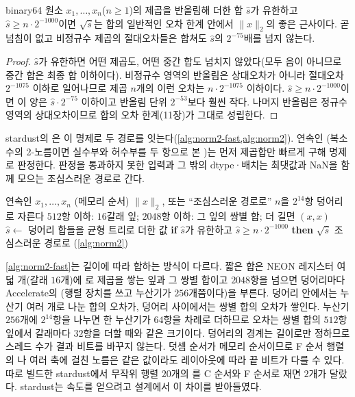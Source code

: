\begin{proposition}
\label{prop:norm-trust}
binary64 원소 $x_1,\dots,x_n$($n\ge1$)의 제곱을 반올림해 더한 합 $\hat s$가 유한하고 $\hat s\ge n\cdot2^{-1000}$이면 $\sqrt{\hat s}$는 합의 일반적인 오차 한계 안에서 $\|x\|_2$의 좋은 근사이다. 곧 넘침이 없고 비정규수 제곱의 절대오차들은 합쳐도 $\hat s$의 $2^{-75}$배를 넘지 않는다.
\end{proposition}

\begin{proof}
$\hat s$가 유한하면 어떤 제곱도, 어떤 중간 합도 넘치지 않았다(모두 음이 아니므로 중간 합은 최종 합 이하이다). 비정규수 영역의 반올림은 상대오차가 아니라 절대오차 $2^{-1075}$ 이하로 일어나므로 제곱 $n$개의 이런 오차는 $n\cdot2^{-1075}$ 이하이다. $\hat s\ge n\cdot2^{-1000}$이면 이 양은 $\hat s\cdot2^{-75}$ 이하이고 반올림 단위 $2^{-53}$보다 훨씬 작다. 나머지 반올림은 정규수 영역의 상대오차이므로 합의 오차 한계(11장)가 그대로 성립한다.
\end{proof}

stardust의 은 이 명제로 두 경로를 잇는다(\cref{alg:norm2-fast,alg:norm2}). 연속인 (복소수의 2-노름이면 실수부와 허수부를 두 항으로 본 )는 먼저 제곱합만 빠르게 구해 명제로 판정한다. 판정을 통과하지 못한 입력과 그 밖의 dtype·배치는 최댓값과 NaN을 함께 모으는 조심스러운 경로로 간다.

\begin{algorithm}[htbp]
\begin{algorithmic}[1]
\Require 연속인  $x_1,\dots,x_n$ (메모리 순서)
\Ensure $\|x\|_2$, 또는 ``조심스러운 경로로''
\State $n$을 $2^{14}$항 덩어리로 자른다 
  \State $512$항 이하: $16$갈래  잎; $2048$항 이하: 그 잎의 쌍별 합; 더 길면 $(x,x)$
\EndFor
\State $\hat s\gets$ 덩어리 합들을 균형 트리로 더한 값
\State \textbf{if} $\hat s$가 유한하고 $\hat s\ge n\cdot2^{-1000}$ \textbf{then} \Return $\sqrt{\hat s}$ 
\State \Return 조심스러운 경로로 (\cref{alg:norm2}) 
\end{algorithmic}
\caption{2-노름의 빠른 경로 (stardust , )}
\label{alg:norm2-fast}
\end{algorithm}

\cref{alg:norm2-fast}는 길이에 따라 합하는 방식이 다르다. 짧은 합은 NEON 레지스터 여덟 개(갈래 $16$개)에 로 제곱을 쌓는 잎과 그 쌍별 합이고 $2048$항을 넘으면 덩어리마다 Accelerate의 (행렬 장치를 쓰고 누산기가 $256$개쯤이다)을 부른다. 덩어리 안에서는 누산기 여러 개로 나눈 합의 오차가, 덩어리 사이에서는 쌍별 합의 오차가 쌓인다. 누산기 $256$개에 $2^{14}$항을 나누면 한 누산기가 $64$항을 차례로 더하므로 오차는 쌍별 합의 $512$항 잎에서 갈래마다 $32$항을 더할 때와 같은 크기이다. 덩어리의 경계는 길이로만 정하므로 스레드 수가 결과 비트를 바꾸지 않는다. 덧셈 순서가 메모리 순서이므로 F 순서 행렬의 나 여러 축에 걸친 노름은 같은 값이라도 레이아웃에 따라 끝 비트가 다를 수 있다. 따로 빌드한 stardust에서 무작위 행렬 $20$개의 를 C 순서와 F 순서로 재면 $2$개가 달랐다. stardust는 속도를 얻으려고 설계에서 이 차이를 받아들였다.

